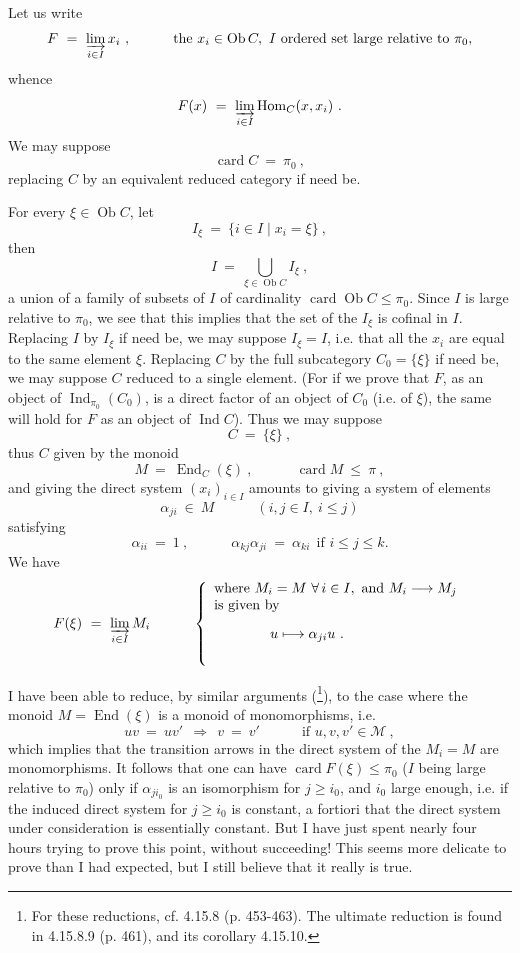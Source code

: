\documentclass[11pt]{article}
\newcommand{\printedpage}[1]{\marginpar{\footnotesize p.~#1}}
\newcommand{\msp}[1]{\marginpar{\footnotesize [#1]}}
\newcommand{\Ind}{\operatorname{Ind}}
\newcommand{\card}{\operatorname{card}}
\newcommand{\Ob}{\operatorname{Ob}}
\newcommand{\Hom}{\operatorname{Hom}}
\newcommand{\End}{\operatorname{End}}
\newcommand{\cM}{\mathcal{M}}
\begin{document}
Let us write
\[
F \ = \ \varinjlim_{i\in I} x_i\ , \qquad\quad \text{the } x_i \in \Ob C,\ I \text{ ordered set large relative to } \pi_0,
\]
whence
\[
F(x) \ = \ \varinjlim_{i\in I} \Hom_C(x, x_i)\ .
\]
We may suppose
\[
\card C \ = \ \pi_0\ ,
\]
replacing $C$ by an equivalent reduced category if need be.

For every $\xi \in \Ob C$, let
\[
I_{\xi} \ = \ \{ i \in I \mid x_i = \xi \}\ ,
\]
then
\[
I \ = \ \bigcup_{\xi\in\Ob C} I_{\xi}\ ,
\]
\msp{page 215}
a union of a family of subsets of $I$ of cardinality $\card\Ob C \leqslant \pi_0$. Since $I$ is large relative to $\pi_0$, we see that this implies that the set of the $I_{\xi}$ is cofinal in $I$. Replacing $I$ by $I_{\xi}$ if need be, we may suppose $I_{\xi} = I$, i.e. that all the $x_i$ are equal to the same element $\xi$. Replacing $C$ by the full subcategory $C_0 = \{\xi\}$ if need be, we may suppose $C$ reduced to a single element. (For if we prove that $F$, as an object of $\Ind_{\pi_0}(C_0)$, is a direct factor of an object of $C_0$ (i.e. of $\xi$), the same will hold for $F$ as an object of $\Ind C$). Thus we may suppose
\[
C \ = \ \{\xi\}\ ,
\]
thus $C$ given by the monoid
\[
M \ = \ \End_C(\xi)\ , \qquad\quad \card M \ \leqslant\ \pi\ ,
\]
and giving the direct system $(x_i)_{i\in I}$ amounts to giving a system of elements
\[
\alpha_{ji} \ \in\ M \qquad\quad (i, j \in I,\ i \leqslant j)
\]
\printedpage{77}
satisfying
\[
\alpha_{ii} \ = \ 1\ , \qquad\quad \alpha_{kj}\alpha_{ji} \ = \ \alpha_{ki} \ \ \text{if } i \leqslant j \leqslant k.
\]
We have
\[
F(\xi) \ = \ \varinjlim_{i\in I} M_i \qquad\quad
\left\{
\begin{array}{l}
\text{where } M_i = M \ \forall\, i \in I, \text{ and } M_i \longrightarrow M_j \\
\text{is given by} \\[2ex]
\qquad\qquad u \longmapsto \alpha_{ji}u\ . \\[4ex]
\end{array}
\right.
\]

\msp{page 216}

I have been able to reduce, by similar arguments (\footnote[92]{For these reductions, cf. 4.15.8 (p. 453-463). The ultimate reduction is found in 4.15.8.9 (p. 461), and its corollary 4.15.10.}), to the case where the monoid $M = \End(\xi)$ is a monoid of monomorphisms, i.e.
\[
uv \ = \ uv' \ \ \Longrightarrow\ \ v \ = \ v' \qquad\quad \text{if } u, v, v' \in \cM\ ,
\] %
which implies that the transition arrows in the direct system of the $M_i = M$ are monomorphisms. It follows that one can have $\card F(\xi) \leqslant \pi_0$ ($I$ being large relative to $\pi_0$) only if $\alpha_{ji_0}$ is an isomorphism for $j \geqslant i_0$, and $i_0$ large enough, i.e. if the induced direct system for $j \geqslant i_0$ is constant, a fortiori that the direct system under consideration is essentially constant. But I have just spent nearly four hours trying to prove this point, without succeeding! This seems more delicate to prove than I had expected, but I still believe that it really is true.
\end{document}
